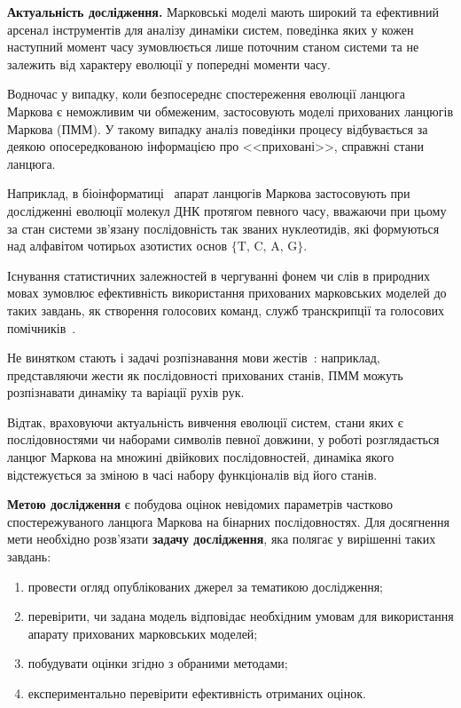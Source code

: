 \textbf{Актуальність дослідження.} Марковські моделі мають широкий та ефективний арсенал інструментів для аналізу динаміки систем, поведінка яких у кожен наступний момент часу зумовлюється лише поточним станом системи та не залежить від характеру еволюції у попередні моменти часу. 

Водночас у випадку, коли безпосереднє спостереження еволюції ланцюга Маркова є неможливим чи обмеженим, застосовують моделі прихованих ланцюгів Маркова (ПММ). У такому випадку аналіз поведінки процесу відбувається за деякою опосередкованою інформацією про <<приховані>>, справжні стани ланцюга. 

Наприклад, в біоінформатиці~\cite[глава 9]{Koski2001} апарат ланцюгів Маркова застосовують при дослідженні еволюції молекул ДНК протягом певного часу, вважаючи при цьому за стан системи зв'язану послідовність так званих нуклеотидів, які формуються над алфавітом чотирьох азотистих основ $\{\text{T, C, A, G} \}$.  

Існування статистичних залежностей в чергуванні фонем чи слів в природних мовах зумовлює ефективність використання прихованих марковських моделей до таких завдань, як створення голосових команд, служб транскрипції та голосових помічників~\cite{Rabiner1989}.

Не винятком стають і задачі розпізнавання мови жестів~\cite{Chaaraoui2013}: наприклад, представляючи жести як послідовності прихованих станів, ПММ можуть розпізнавати динаміку та варіації рухів рук.

Відтак, враховуючи актуальність вивчення еволюції систем, стани яких є послідовностями чи наборами символів певної довжини, у роботі розглядається ланцюг Маркова на множині двійкових послідовностей, динаміка якого відстежується за зміною в часі набору функціоналів від його станів.

\textbf{Метою дослідження} є побудова оцінок невідомих параметрів частково спостережуваного ланцюга Маркова на бінарних послідовностях. Для досягнення мети необхідно розв'язати \textbf{задачу дослідження}, яка полягає у вирішенні таких завдань:

\begin{enumerate}
\item провести огляд опублікованих джерел за тематикою дослідження;
\item перевірити, чи задана модель відповідає необхідним умовам для використання апарату прихованих марковських моделей;
\item побудувати оцінки згідно з обраними методами;
\item експериментально перевірити ефективність отриманих оцінок.
\end{enumerate}


